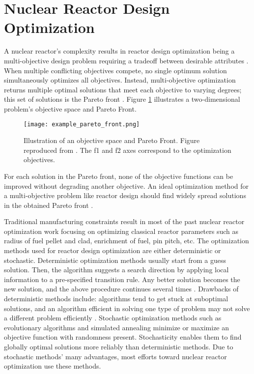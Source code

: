 \section{Nuclear Reactor Design Optimization}
\label{sec:opt}
A nuclear reactor's complexity results in reactor design optimization being a 
multi-objective design problem requiring a tradeoff between desirable 
attributes \cite{byrne_evolving_2014,simon_sciences_2019}. 
When multiple conflicting objectives compete, no single optimum solution 
simultaneously optimizes all objectives. 
Instead, multi-objective optimization returns multiple optimal 
solutions that meet each objective to varying degrees; this set of solutions is 
the Pareto front \cite{deb_multi-objective_2001}. 
Figure \ref{fig:pareto} illustrates a two-dimensional problem's objective space and 
Pareto Front. 
\begin{figure}[htbp]
    \centering
    \texttt{[image: example\_pareto\_front.png]} 
    \caption{Illustration of an objective space and Pareto Front. Figure reproduced 
    from \cite{deb_multi-objective_2001}. 
    The f1 and f2 axes correspond to the optimization objectives.}
    \label{fig:pareto}
\end{figure}
For each solution in the Pareto front, none of the objective functions can be 
improved without degrading another objective.
An ideal optimization method for a multi-objective problem like reactor design 
should find widely spread solutions in the obtained Pareto front 
\cite{deb_multi-objective_2001}.  

Traditional manufacturing constraints result in most of the past nuclear reactor 
optimization work focusing on optimizing classical reactor 
parameters such as radius of fuel pellet and clad, enrichment of fuel, 
pin pitch, etc. 
The optimization methods used for reactor design optimization are either 
deterministic or stochastic. 
Deterministic optimization methods usually start from a guess solution.
Then, the algorithm suggests a search direction by applying local 
information to a pre-specified transition rule. 
Any better solution becomes the new solution, and the above procedure continues 
several times \cite{deb_multi-objective_2001}. 
Drawbacks of deterministic methods include: algorithms tend to get stuck at
suboptimal solutions, and an algorithm efficient in solving one type of problem 
may not solve a different problem efficiently \cite{deb_multi-objective_2001}. 
Stochastic optimization methods such as evolutionary algorithms and simulated annealing
minimize or maximize an objective function with randomness present. 
Stochasticity enables them to find globally optimal solutions more reliably than 
deterministic methods. 
Due to stochastic methods' many advantages, most efforts toward nuclear 
reactor optimization use these methods. 

